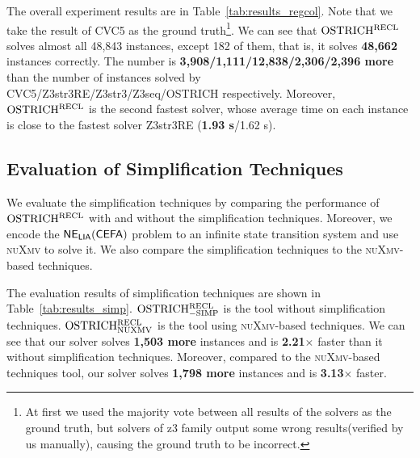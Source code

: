 The overall experiment results are in Table~\ref{tab:results_regcol}. Note that we take the result of CVC5 as the ground truth\footnote{At first we used the majority vote between all results of the solvers as the ground truth, but solvers of z3 family output some wrong results(verified by us manually), causing the ground truth to be incorrect.}. We can see that $\rm OSTRICH^{RECL}$ solves almost all 48,843 instances, except 182 of them, that is, it solves \textbf{48,662} instances correctly. The number is %
\textbf{3,908/1,111/12,838/2,306/2,396 more} than the number of instances solved by CVC5/Z3str3RE/Z3str3/Z3seq/OSTRICH respectively.
%      
%
Moreover, $\rm OSTRICH^{RECL}$ is the second fastest solver, whose average time on each instance is close to the fastest solver Z3str3RE (\textbf{1.93 s}/1.62 s).
\vspace{-2mm}
\subsection{Evaluation of Simplification Techniques}
\vspace{-1mm}

We evaluate the simplification techniques by comparing the performance of $\rm OSTRICH^{RECL}$ with and without the simplification techniques. Moreover, we encode the ${\sf NE_{LIA}(CEFA)}$ problem to an infinite state transition system and use \textsc{nuXmv}\cite{nuxmv} to solve it. We also compare the simplification techniques to the \textsc{nuXmv}-based techniques.

The evaluation results of simplification techniques are shown in Table~\ref{tab:results_simp}. $\rm OSTRICH^{RECL}_{\rm -SIMP}$ is the tool without simplification techniques. $\rm OSTRICH^{RECL}_{\rm NUXMV}$ is the tool using \textsc{nuXmv}-based techniques. We can see that our solver solves \textbf{1,503 more} instances and is \textbf{2.21$\times$} faster than it without simplification techniques. Moreover, compared to the \textsc{nuXmv}-based techniques tool, our solver solves \textbf{1,798 more} instances and is \textbf{3.13$\times$} faster. 

